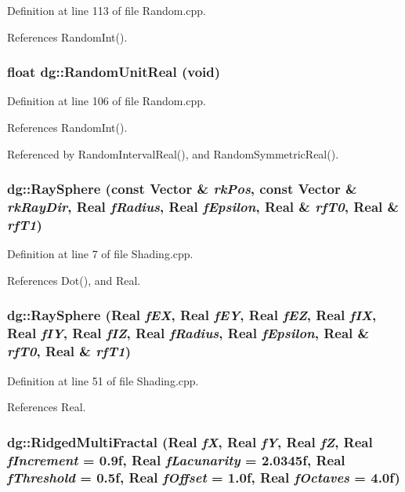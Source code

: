 Definition at line 113 of file Random.cpp.

References Random\-Int().
\subsubsection{\setlength{\rightskip}{0pt plus 5cm}float dg::Random\-Unit\-Real (void)}\label{namespacedg_a168}




Definition at line 106 of file Random.cpp.

References Random\-Int().

Referenced by Random\-Interval\-Real(), and Random\-Symmetric\-Real().
\subsubsection{ dg::Ray\-Sphere (const {\bf Vector} \& {\em rk\-Pos}, const {\bf Vector} \& {\em rk\-Ray\-Dir}, {\bf Real} {\em f\-Radius}, {\bf Real} {\em f\-Epsilon}, {\bf Real} \& {\em rf\-T0}, {\bf Real} \& {\em rf\-T1})}\label{namespacedg_a178}




Definition at line 7 of file Shading.cpp.

References Dot(), and Real.
\subsubsection{ dg::Ray\-Sphere ({\bf Real} {\em f\-EX}, {\bf Real} {\em f\-EY}, {\bf Real} {\em f\-EZ}, {\bf Real} {\em f\-IX}, {\bf Real} {\em f\-IY}, {\bf Real} {\em f\-IZ}, {\bf Real} {\em f\-Radius}, {\bf Real} {\em f\-Epsilon}, {\bf Real} \& {\em rf\-T0}, {\bf Real} \& {\em rf\-T1})}\label{namespacedg_a177}




Definition at line 51 of file Shading.cpp.

References Real.
\subsubsection{ dg::Ridged\-Multi\-Fractal ({\bf Real} {\em f\-X}, {\bf Real} {\em f\-Y}, {\bf Real} {\em f\-Z}, {\bf Real} {\em f\-Increment} = 0.9f, {\bf Real} {\em f\-Lacunarity} = 2.0345f, {\bf Real} {\em f\-Threshold} = 0.5f, {\bf Real} {\em f\-Offset} = 1.0f, {\bf Real} {\em f\-Octaves} = 4.0f)}\label{namespacedg_a135}





